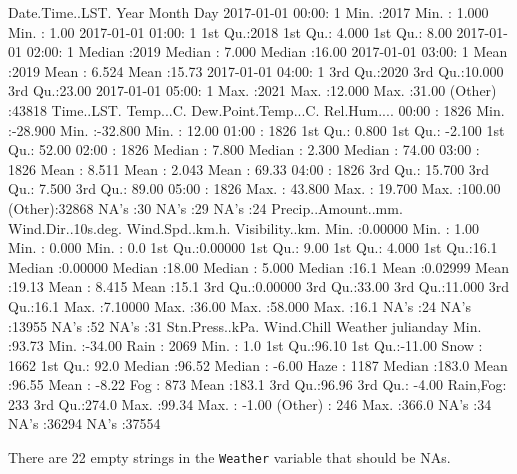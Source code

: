 \documentclass[11pt, a4paper]{article}
\begin{document}
\begin{Schunk}
\begin{Soutput}
         Date.Time..LST.       Year          Month             Day       
 2017-01-01 00:00:    1   Min.   :2017   Min.   : 1.000   Min.   : 1.00  
 2017-01-01 01:00:    1   1st Qu.:2018   1st Qu.: 4.000   1st Qu.: 8.00  
 2017-01-01 02:00:    1   Median :2019   Median : 7.000   Median :16.00  
 2017-01-01 03:00:    1   Mean   :2019   Mean   : 6.524   Mean   :15.73  
 2017-01-01 04:00:    1   3rd Qu.:2020   3rd Qu.:10.000   3rd Qu.:23.00  
 2017-01-01 05:00:    1   Max.   :2021   Max.   :12.000   Max.   :31.00  
 (Other)         :43818                                                  
   Time..LST.      Temp...C.       Dew.Point.Temp...C.  Rel.Hum....    
 00:00  : 1826   Min.   :-28.900   Min.   :-32.800     Min.   : 12.00  
 01:00  : 1826   1st Qu.:  0.800   1st Qu.: -2.100     1st Qu.: 52.00  
 02:00  : 1826   Median :  7.800   Median :  2.300     Median : 74.00  
 03:00  : 1826   Mean   :  8.511   Mean   :  2.043     Mean   : 69.33  
 04:00  : 1826   3rd Qu.: 15.700   3rd Qu.:  7.500     3rd Qu.: 89.00  
 05:00  : 1826   Max.   : 43.800   Max.   : 19.700     Max.   :100.00  
 (Other):32868   NA's   :30        NA's   :29          NA's   :24      
 Precip..Amount..mm. Wind.Dir..10s.deg. Wind.Spd..km.h.  Visibility..km.
 Min.   :0.00000     Min.   : 1.00      Min.   : 0.000   Min.   : 0.0   
 1st Qu.:0.00000     1st Qu.: 9.00      1st Qu.: 4.000   1st Qu.:16.1   
 Median :0.00000     Median :18.00      Median : 5.000   Median :16.1   
 Mean   :0.02999     Mean   :19.13      Mean   : 8.415   Mean   :15.1   
 3rd Qu.:0.00000     3rd Qu.:33.00      3rd Qu.:11.000   3rd Qu.:16.1   
 Max.   :7.10000     Max.   :36.00      Max.   :58.000   Max.   :16.1   
 NA's   :24          NA's   :13955      NA's   :52       NA's   :31     
 Stn.Press..kPa.   Wind.Chill         Weather        julianday    
 Min.   :93.73   Min.   :-34.00   Rain    : 2069   Min.   :  1.0  
 1st Qu.:96.10   1st Qu.:-11.00   Snow    : 1662   1st Qu.: 92.0  
 Median :96.52   Median : -6.00   Haze    : 1187   Median :183.0  
 Mean   :96.55   Mean   : -8.22   Fog     :  873   Mean   :183.1  
 3rd Qu.:96.96   3rd Qu.: -4.00   Rain,Fog:  233   3rd Qu.:274.0  
 Max.   :99.34   Max.   : -1.00   (Other) :  246   Max.   :366.0  
 NA's   :34      NA's   :36294    NA's    :37554                  
\end{Soutput}
\end{Schunk}

\pagebreak

There are 22 empty strings in the \texttt{Weather} variable that should be NAs.
\end{document}

